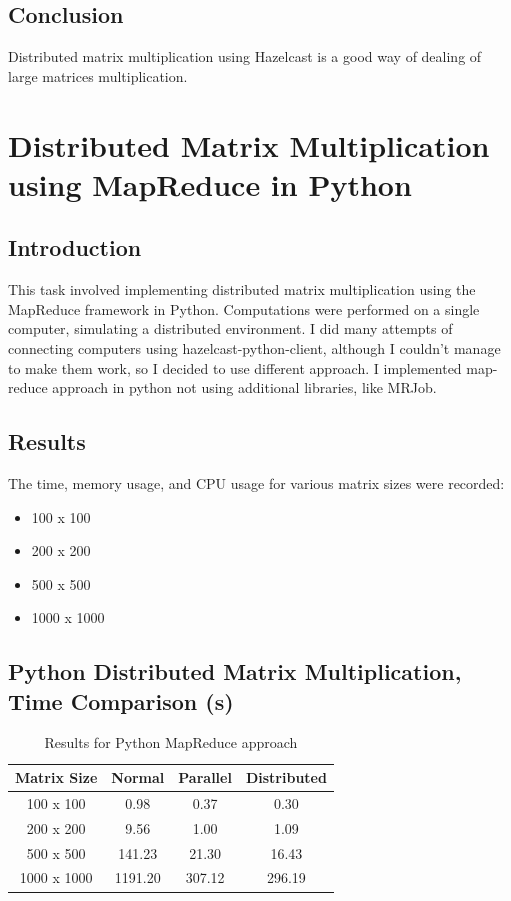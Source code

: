 \documentclass{article}
\begin{document}
\subsection{Conclusion}
Distributed matrix multiplication using Hazelcast is a good way of dealing of large matrices multiplication.

\section{Distributed Matrix Multiplication using MapReduce in Python}

\subsection{Introduction}
This task involved implementing distributed matrix multiplication using the MapReduce framework in Python. Computations were performed on a single computer, simulating a distributed environment. I did many attempts of connecting computers using hazelcast-python-client, although I couldn't manage to make them work, so I decided to use different approach. I implemented map-reduce approach in python not using additional libraries, like MRJob.

\subsection{Results}
The time, memory usage, and CPU usage for various matrix sizes were recorded:
\begin{itemize}
    \item 100 x 100
    \item 200 x 200
    \item 500 x 500
    \item 1000 x 1000
\end{itemize}

\subsection{Python Distributed Matrix Multiplication, Time Comparison (s)}
\begin{table}[H]
    \centering
    \begin{tabular}{|c|c|c|c|}
    \hline
    Matrix Size & Normal & Parallel & Distributed \\
    \hline
    100 x 100 & 0.98 & 0.37 & 0.30 \\
    200 x 200 & 9.56 & 1.00 & 1.09 \\
    500 x 500 & 141.23 & 21.30 & 16.43 \\
    1000 x 1000 & 1191.20 & 307.12 & 296.19 \\
    \hline
    \end{tabular}
    \caption{Results for Python MapReduce approach}
\end{table}
\end{document}
